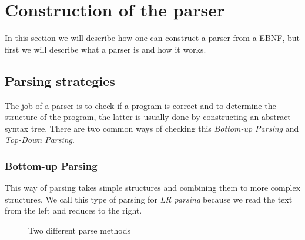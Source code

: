 
\section{Construction of the parser}
	In this section we will describe how one can construct a parser from a EBNF, but first we will describe what a parser is and how it works.
	
	\subsection{Parsing strategies}
		The job of a parser is to check if a program is correct and 
		to determine the structure of the program, the latter is usually done by constructing an abstract syntax tree.
		There are two common ways of checking this {\it Bottom-up Parsing} and {\it Top-Down Parsing}.
		
		\subsubsection*{Bottom-up Parsing}
			This way of parsing takes simple structures and combining them to more complex structures.
			We call this type of parsing for {\it LR parsing} because we read the text from the left and reduces to the right.
			\begin{figure}[H]
				\centering
				\caption{Two different parse methods}\label{fig:parsers}
			\end{figure}
			
